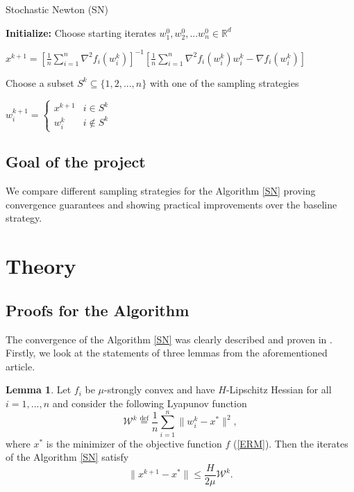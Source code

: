 \documentclass{article}
\theoremstyle{definition}
\theoremstyle{assumption}
\theoremstyle{lemma}
\newtheorem{lemma}{Lemma}
\theoremstyle{theorem}
\theoremstyle{proposition}
\begin{document}
	\begin{algorithm}
		\caption{Stochastic Newton (SN)}\label{SN}
		\begin{algorithmic}
			\item \textbf{Initialize:} Choose starting iterates $w_1^0, w_2^0, ... w_n^0 \in \mathbb R^d$
			
			\item {}	
			
				$ x^{k+1} = \left[ \frac{1}{n} \sum \limits_{i=1}^n \nabla^2 f_i(w_i^k) \right]^{-1} \left[ \frac{1}{n} \sum \limits_{i=1}^n \nabla^2 f_i(w_i^k) w_i^k - \nabla f_i(w_i^k) \right] $
				
				Choose a subset $S^k \subseteq \{ 1, 2, ..., n \}$ with one of the sampling strategies
				
				$w_i^{k+1} = 
				\begin{cases}
					x^{k+1} & i \in S^k \\
					w_i^k & i \notin S^k
				\end{cases}$
				
			\item \EndFor
		\end{algorithmic}
	\end{algorithm}

	\subsection{Goal of the project}
	
	We compare different sampling strategies for the Algorithm \ref{SN} proving convergence guarantees and showing practical improvements over the baseline strategy.
	

\section{Theory}	
	
	\subsection{Proofs for the Algorithm}
	
	The convergence of the Algorithm \ref{SN} was clearly described and proven in \cite{kovalev2019stochastic}. Firstly, we look at the statements of three lemmas from the aforementioned article.
	
	\begin{lemma}\label{lemma:1}
		Let $f_i$ be $\mu$-strongly convex and have $H$-Lipschitz Hessian for all $i = 1,...,n$ and consider the following Lyapunov function
		\begin{equation}
			\mathcal W^k \overset{\text{def}} = \frac{1}{n} \sum \limits_{i=1}^n \| w_i^k - x^* \|^2,
		\end{equation}
		where $x^*$ is the minimizer of the objective function $f$ (\ref{ERM}). Then the iterates of the Algorithm \ref{SN} satisfy
		\begin{equation}
			\|x^{k+1} - x^*\| \leqslant \frac{H}{2 \mu} \mathcal W^k.
		\end{equation}
	\end{lemma}
\end{document}
